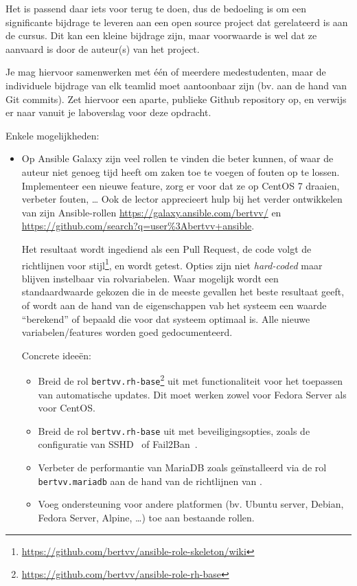 Het is passend daar iets voor terug te doen, dus de bedoeling is om een significante bijdrage te leveren aan een open source project dat gerelateerd is aan de cursus. Dit kan een kleine bijdrage zijn, maar voorwaarde is wel dat ze aanvaard is door de auteur(s) van het project.

Je mag hiervoor samenwerken met één of meerdere medestudenten, maar de individuele bijdrage van elk teamlid moet aantoonbaar zijn (bv. aan de hand van Git commits). Zet hiervoor een aparte, publieke Github repository op, en verwijs er naar vanuit je laboverslag voor deze opdracht.

Enkele mogelijkheden:

\begin{itemize}
\item Op Ansible Galaxy zijn veel rollen te vinden die beter kunnen, of waar de auteur niet genoeg tijd heeft om zaken toe te voegen of fouten op te lossen. Implementeer een nieuwe feature, zorg er voor dat ze op CentOS 7 draaien, verbeter fouten, \ldots{} Ook de lector apprecieert hulp bij het verder ontwikkelen van zijn Ansible-rollen \url{https://galaxy.ansible.com/bertvv/} en \url{https://github.com/search?q=user\%3Abertvv+ansible}.

  Het resultaat wordt ingediend als een Pull Request, de code volgt de richtlijnen voor stijl\footnote{\url{https://github.com/bertvv/ansible-role-skeleton/wiki}}, en wordt getest. Opties zijn niet \emph{hard-coded} maar blijven instelbaar via rolvariabelen. Waar mogelijk wordt een standaardwaarde gekozen die in de meeste gevallen het beste resultaat geeft, of wordt aan de hand van de eigenschappen vab het systeem een waarde ``berekend'' of bepaald die voor dat systeem optimaal is. Alle nieuwe variabelen/features worden goed gedocumenteerd.

  Concrete ideeën:

  \begin{itemize}
    \item Breid de rol \texttt{bertvv.rh-base}\footnote{\url{https://github.com/bertvv/ansible-role-rh-base}} uit met functionaliteit voor het toepassen van automatische updates. Dit moet werken zowel voor Fedora Server als voor CentOS.
    \item Breid de rol \texttt{bertvv.rh-base} uit met beveiligingsopties, zoals de configuratie van SSHD~\autocite{stribika2015,Moundalexis2016} of Fail2Ban~\autocite{Sawiyati2014}.
    \item Verbeter de performantie van MariaDB zoals geïnstalleerd via de rol \texttt{bertvv.mariadb} aan de hand van de richtlijnen van \textcite{Aun2016}.
    \item Voeg ondersteuning voor andere platformen (bv. Ubuntu server, Debian, Fedora Server, Alpine, \ldots) toe aan bestaande rollen.
  \end{itemize}


\end{itemize}
